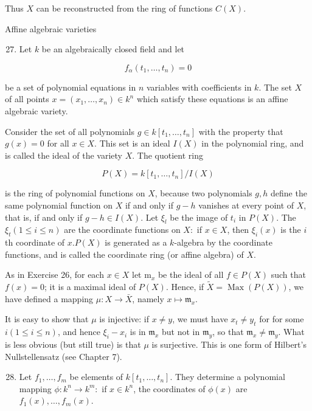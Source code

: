 \documentclass{standalone}
\theoremstyle{definition}
\theoremstyle{remark}
\begin{document}
Thus $X$ can be reconstructed from the ring of functions $C(X)$.

Affine algebraic varieties

\begin{enumerate}
  \setcounter{enumi}{26}
  \item Let $k$ be an algebraically closed field and let
\end{enumerate}

\[
f_{\alpha}\left(t_{1}, \ldots, t_{n}\right)=0
\]

be a set of polynomial equations in $n$ variables with coefficients in $k$. The set $X$ of all points $x=\left(x_{1}, \ldots, x_{n}\right) \in k^{n}$ which satisfy these equations is an affine algebraic variety.

Consider the set of all polynomials $g \in k\left[t_{1}, \ldots, t_{n}\right]$ with the property that $g(x)=0$ for all $x \in X$. This set is an ideal $I(X)$ in the polynomial ring, and is called the ideal of the variety $X$. The quotient ring

\[
P(X)=k\left[t_{1}, \ldots, t_{n}\right] / I(X)
\]

is the ring of polynomial functions on $X$, because two polynomials $g, h$ define the same polynomial function on $X$ if and only if $g-h$ vanishes at every point of $X$, that is, if and only if $g-h \in I(X)$. Let $\xi_{l}$ be the image of $t_{i}$ in $P(X)$. The $\xi_{t}(1 \leqslant i \leqslant n)$ are the coordinate functions on $X:$ if $x \in X$, then $\xi_{i}(x)$ is the $i$ th coordinate of $x . P(X)$ is generated as a $k$-algebra by the coordinate functions, and is called the coordinate ring (or affine algebra) of $X$.

As in Exercise 26, for each $x \in X$ let $\mathrm{m}_{x}$ be the ideal of all $f \in P(X)$ such that $f(x)=0$; it is a maximal ideal of $P(X)$. Hence, if $\tilde{X}=\operatorname{Max}(P(X))$, we have defined a mapping $\mu: X \rightarrow \bar{X}$, namely $x \mapsto \mathfrak{m}_{x}$.

It is easy to show that $\mu$ is injective: if $x \neq y$, we must have $x_{t} \neq y_{t}$ for for some $i(1 \leqslant i \leqslant n)$, and hence $\xi_{i}-x_{i}$ is in $\mathfrak{m}_{x}$ but not in $\mathfrak{m}_{y}$, so that $\mathfrak{m}_{x} \neq \mathfrak{m}_{y}$. What is less obvious (but still true) is that $\mu$ is surjective. This is one form of Hilbert's Nullstellensatz (see Chapter 7).

\begin{enumerate}
  \setcounter{enumi}{27}
  \item Let $f_{1}, \ldots, f_{m}$ be elements of $k\left[t_{1}, \ldots, t_{n}\right]$. They determine a polynomial mapping $\phi: k^{n} \rightarrow k^{m}:$ if $x \in k^{n}$, the coordinates of $\phi(x)$ are $f_{1}(x), \ldots, f_{m}(x)$.
\end{enumerate}
\end{document}
